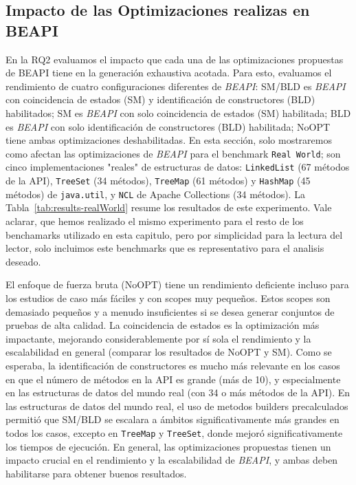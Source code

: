 \subsection{Impacto de las Optimizaciones realizas en BEAPI}
En la RQ2 evaluamos el impacto que cada una de las optimizaciones propuestas de \textsf{BEAPI} tiene en la generación exhaustiva acotada. Para esto, evaluamos el rendimiento de cuatro configuraciones diferentes de \emph{BEAPI}: \textsf{SM/BLD} es \emph{BEAPI} con coincidencia de estados (SM) y identificación de constructores (BLD) habilitados; \textsf{SM} es \emph{BEAPI} con solo coincidencia de estados (SM) habilitada; \textsf{BLD} es \emph{BEAPI} con solo identificación de constructores (BLD) habilitada; \textsf{NoOPT} tiene ambas optimizaciones deshabilitadas. En esta sección, solo mostraremos como afectan las optimizaciones de \emph{BEAPI} para el benchmark \texttt{Real World}; son cinco implementaciones "reales" de estructuras de datos: \texttt{LinkedList} (67 métodos de la API), \texttt{TreeSet} (34 métodos), \texttt{TreeMap} (61 métodos) y \texttt{HashMap} (45 métodos) de \texttt{java.util}, y \texttt{NCL} de Apache Collections (34 métodos).
La Tabla~\ref{tab:results-realWorld} resume los resultados de este experimento.
Vale aclarar, que hemos realizado el mismo experimento para el resto de los benchamarks utilizado en esta capitulo, pero por simplicidad para la lectura del lector, solo incluimos este benchmarks que es representativo para el analisis deseado.

El enfoque de fuerza bruta (\textsf{NoOPT}) tiene un rendimiento deficiente incluso para los estudios de caso más fáciles y con scopes muy pequeños. Estos scopes son demasiado pequeños y a menudo insuficientes si se desea generar conjuntos de pruebas de alta calidad. La coincidencia de estados es la optimización más impactante, mejorando considerablemente por sí sola el rendimiento y la escalabilidad en general (comparar los resultados de \textsf{NoOPT} y \textsf{SM}). Como se esperaba, la identificación de constructores es mucho más relevante en los casos en que el número de métodos en la API es grande (más de 10), y especialmente en las estructuras de datos del mundo real (con 34 o más métodos de la API). En las estructuras de datos del mundo real, el uso de metodos builders precalculados permitió que \textsf{SM/BLD} se escalara a ámbitos significativamente más grandes en todos los casos, excepto en \texttt{TreeMap} y \texttt{TreeSet}, donde mejoró significativamente los tiempos de ejecución. En general, las optimizaciones propuestas tienen un impacto crucial en el rendimiento y la escalabilidad de \emph{BEAPI}, y ambas deben habilitarse para obtener buenos resultados.


